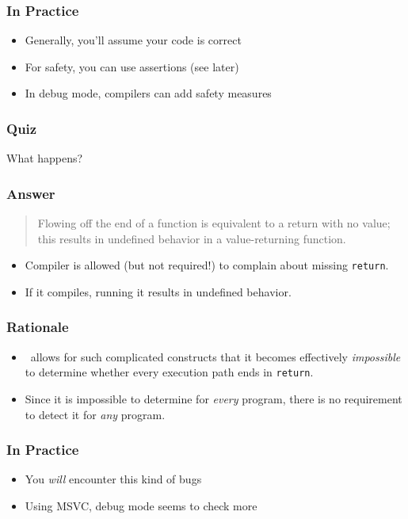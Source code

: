 \begin{frame}
  \frametitle{In Practice}
  \begin{itemize}
    \item Generally, you'll assume your code is correct
    \item For safety, you can use assertions (see later)
    \item In debug mode, compilers can add safety measures
  \end{itemize}
\end{frame}

\begin{frame}
  \frametitle{Quiz}
  \begin{center}
    {\Large What happens?}\vskip2cm
  \end{center}
\end{frame}

\begin{frame}
  \frametitle{Answer}
  \begin{quote}
    Flowing off the end of a function is equivalent to a return with no value; this results in undefined
    behavior in a value-returning function. \\
    \hfill {}
  \end{quote}
  \begin{itemize}
    \item Compiler is allowed (but not required!) to complain about missing {\tt return}.
    \item If it compiles, running it results in undefined behavior.
  \end{itemize}
\end{frame}

\begin{frame}
  \frametitle{Rationale}
  \begin{itemize}
    \item \cpp\ allows for such complicated constructs
          that it becomes effectively \emph{impossible}
          to determine whether every execution path ends in {\tt return}.
    \item Since it is impossible to determine for \emph{every} program,
          there is no requirement to detect it for \emph{any} program.
  \end{itemize}
\end{frame}

\begin{frame}
  \frametitle{In Practice}
  \begin{itemize}
    \item You \emph{will} encounter this kind of bugs
    \item Using MSVC, debug mode seems to check more
  \end{itemize}
\end{frame}


